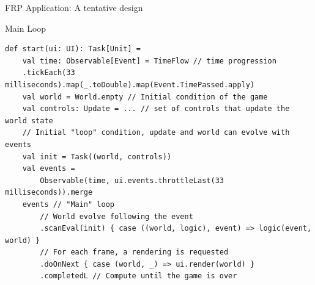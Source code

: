 \documentclass[presentation, 9pt]{beamer}\mode<presentation>{\usetheme{AMSBolognaFC}}
\begin{document}
\begin{frame}{FRP Application: A tentative design \href{https://github.com/cric96/scala-frp-gui}{\faLink}}
			\begin{alertblock}{Main Loop}
				\begin{tcolorbox}[left=0pt, top=0pt, bottom=0pt]
					\begin{verbatim}
def start(ui: UI): Task[Unit] =
	val time: Observable[Event] = TimeFlow // time progression
    .tickEach(33 milliseconds).map(_.toDouble).map(Event.TimePassed.apply)
	val world = World.empty // Initial condition of the game
	val controls: Update = ... // set of controls that update the world state
	// Initial "loop" condition, update and world can evolve with events
	val init = Task((world, controls))
	val events =
		Observable(time, ui.events.throttleLast(33 milliseconds)).merge
	events // "Main" loop
		// World evolve following the event 
		.scanEval(init) { case ((world, logic), event) => logic(event, world) }
		// For each frame, a rendering is requested
		.doOnNext { case (world, _) => ui.render(world) } 
		.completedL // Compute until the game is over
					\end{verbatim}
					\end{tcolorbox}
				\end{alertblock}	
\end{frame}
\end{document}
